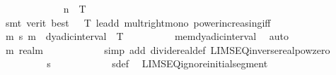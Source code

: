\begin{isabellebody}
\ \ \ \ \ \ \isamarkupfalse%
\ \ {\isacartoucheopen}{}\ {\isasymle}\ {}\ {\isacharcircum}{\kern0pt}\ n\ {\isacharasterisk}{\kern0pt}\ T{\isacartoucheclose}\isanewline
\ \ \ \ \ \ \isamarkupfalse%
\ {\isacharparenleft}{\kern0pt}smt\ {\isacharparenleft}{\kern0pt}verit{\isacharcomma}{\kern0pt}\ best{\isacharparenright}{\kern0pt}\ {\isacartoucheopen}{}\ {\isacharless}{\kern0pt}\ T{\isacartoucheclose}\ le{\isacharunderscore}{\kern0pt}add{}\ mult{\isacharunderscore}{\kern0pt}right{\isacharunderscore}{\kern0pt}mono\ power{\isacharunderscore}{\kern0pt}increasing{\isacharunderscore}{\kern0pt}iff{\isacharparenright}{\kern0pt}\isanewline
\ \ \ \ \isamarkupfalse%
\ \isamarkupfalse%
\ {\isachardoublequoteopen}{\isasymforall}m{\isachardot}{\kern0pt}\ s\ m\ {\isasymin}\ dyadic{\isacharunderscore}{\kern0pt}interval\ {}\ T\ {\isacharminus}{\kern0pt}\ {\isacharbraceleft}{\kern0pt}{}{\isacharbraceright}{\kern0pt}{\isachardoublequoteclose}\isanewline
\ \ \ \ \ \ \isamarkupfalse%
\ mem{\isacharunderscore}{\kern0pt}dyadic{\isacharunderscore}{\kern0pt}interval\ \isamarkupfalse%
\ auto\isanewline
\ \ \ \ \isamarkupfalse%
\ \isacommand{{\isacharbraceleft}{\kern0pt}}\isamarkupfalse%
\isanewline
\ \ \ \ \ \ \isamarkupfalse%
\ {\isachardoublequoteopen}{\isacharparenleft}{\kern0pt}{\isasymlambda}m{\isachardot}{\kern0pt}\ {\isacharparenleft}{\kern0pt}{}{\isacharcolon}{\kern0pt}{\isacharcolon}{\kern0pt}real{\isacharparenright}{\kern0pt}{\isacharslash}{\kern0pt}{}{\isacharcircum}{\kern0pt}m{\isacharparenright}{\kern0pt}\ {\isasymlonglonglongrightarrow}\ {}{\isachardoublequoteclose}\isanewline
\ \ \ \ \ \ \ \ \isamarkupfalse%
\ {\isacharparenleft}{\kern0pt}simp\ add{\isacharcolon}{\kern0pt}\ divide{\isacharunderscore}{\kern0pt}real{\isacharunderscore}{\kern0pt}def\ LIMSEQ{\isacharunderscore}{\kern0pt}inverse{\isacharunderscore}{\kern0pt}realpow{\isacharunderscore}{\kern0pt}zero{\isacharparenright}{\kern0pt}\isanewline
\ \ \ \ \ \ \isamarkupfalse%
\ \isamarkupfalse%
\ {\isachardoublequoteopen}s\ {\isasymlonglonglongrightarrow}\ {}{\isachardoublequoteclose}\isanewline
\ \ \ \ \ \ \ \ \isamarkupfalse%
\ s{\isacharunderscore}{\kern0pt}def\ \isamarkupfalse%
\ LIMSEQ{\isacharunderscore}{\kern0pt}ignore{\isacharunderscore}{\kern0pt}initial{\isacharunderscore}{\kern0pt}segment\ \isamarkupfalse%

\end{isabellebody}
